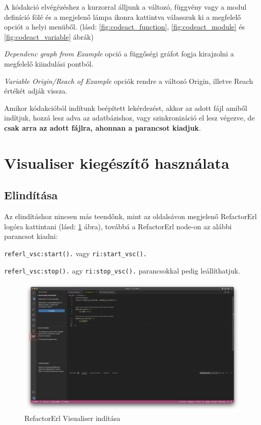 A kódakció elvégézéshez a kurzorral álljunk a változó, függvény vagy a modul definíció fölé és a megjelenő lámpa ikonra kattintva válasszuk ki a megfelelő opciót a helyi menüből. (lásd: \ref{fig:codeact_function}, \ref{fig:codeact_module} és \ref{fig:codeact_variable} ábrák)

\noindent \textit{Dependenc graph from Example} opció a függőségi gráfot fogja kirajzolni a megfelelő kiindulási pontból.

\noindent \textit{Variable Origin/Reach of Example} opciók rendre a változó Origin, illetve Reach értékét adják vissza.

Amikor kódakcióból indítunk beépített lekérdezést, akkor az adott fájl amiből indítjuk, hozzá lesz adva az adatbázishoz, vagy szinkronizáció el lesz végezve, de \textbf{csak arra az adott fájlra, ahonnan a parancsot kiadjuk}.

\section{Visualiser kiegészítő használata}
\subsection{Elindítása}

Az elindításhoz nincsen más teendőnk, mint az oldalsávon megjelenő RefactorErl logóra kattintani (lásd: \ref{fig:start_visualiser} ábra), továbbá a RefactorErl node-on az alábbi parancsot kiadni:

\noindent \lstinline{referl_vsc:start().} vagy \lstinline{ri:start_vsc().}

\noindent \lstinline{referl_vsc:stop().} agy \lstinline{ri:stop_vsc().} parancsokkal pedig leállíthatjuk.

\begin{figure}[H]
  \centering
  \includegraphics[width=\linewidth, clip=true, trim = 0mm 0mm 150mm 0mm]{images/start_visualiser.png}
  \caption{RefactorErl Visualiser indítása}
  \label{fig:start_visualiser}
\end{figure}


